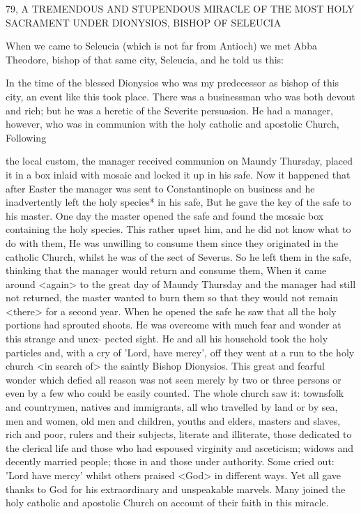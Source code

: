 79, A TREMENDOUS AND STUPENDOUS MIRACLE
OF THE MOST HOLY SACRAMENT
UNDER DIONYSIOS, BISHOP OF SELEUCIA

When we came to Seleucia (which is not far from Antioch) we met
Abba Theodore, bishop of that same city, Seleucia, and he told us
this:

In the time of the blessed Dionysios who was my predecessor as
bishop of this city, an event like this took place.
There was a
businessman who was both devout and rich; but he was a heretic of
the Severite persuasion.
He had a manager, however, who was in
communion with the holy catholic and apostolic Church, Following

the local custom, the manager received communion on Maundy
Thursday, placed it in a box inlaid with mosaic and locked it up in
his safe.
Now it happened that after Easter the manager was sent to
Constantinople on business and he inadvertently left the holy
species* in his safe, But he gave the key of the safe to his master.
One day the master opened the safe and found the mosaic box
containing the holy species.
This rather upset him, and he did not
know what to do with them, He was unwilling to consume them
since they originated in the catholic Church, whilst he was of the
sect of Severus.
So he left them in the safe, thinking that the
manager would return and consume them, When it came around
<again> to the great day of Maundy Thursday and the manager
had still not returned, the master wanted to burn them so that they
would not remain <there> for a second year.
When he opened the
safe he saw that all the holy portions had sprouted shoots.
He was
overcome with much fear and wonder at this strange and unex-
pected sight.
He and all his household took the holy particles and,
with a cry of 'Lord, have mercy', off they went at a run to the holy
church <in search of> the saintly Bishop Dionysios.
This great and
fearful wonder which defied all reason was not seen merely by two
or three persons or even by a few who could be easily counted.
The
whole church saw it: townsfolk and countrymen, natives and
immigrants, all who travelled by land or by sea, men and women,
old men and children, youths and elders, masters and slaves, rich
and poor, rulers and their subjects, literate and illiterate, those
dedicated to the clerical life and those who had espoused virginity
and asceticism; widows and decently married people; those in and
those under authority.
Some cried out: 'Lord have mercy' whilst
others praised <God> in different ways.
Yet all gave thanks to God
for his extraordinary and unspeakable marvels.
Many joined the
holy catholic and apostolic Church on account of their faith in this
miracle.

